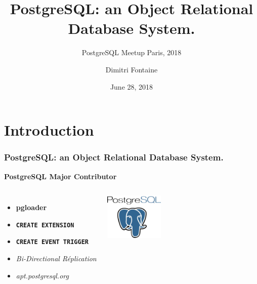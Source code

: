 \documentclass[xcolor=dvipsnames]{beamer}
\title{PostgreSQL: an Object Relational Database System.}
\subtitle{PostgreSQL Meetup Paris, 2018}
\author{Dimitri Fontaine}
\institute{CitusData}
\date{June 28, 2018}
\begin{document}
\section{Introduction}

\frame{\titlepage}

\begin{frame}[fragile]
  \frametitle{PostgreSQL: an Object Relational Database System.}

  \begin{center}
    {}
    \vfill
    {\Large \textbf{PostgreSQL Major Contributor}}
  \end{center}

\begin{columns}[c]

  \begin{itemize}
   \item \textbf{pgloader}
   \item \texttt{\textbf{CREATE EXTENSION}}
   \item \texttt{\textbf{CREATE EVENT TRIGGER}}
   \item \textit{Bi-Directional Réplication}
   \item \textit{apt.postgresql.org}
  \end{itemize}  

\begin{center}
  \includegraphics[height=6em]{postgres-logo.png}
\end{center}
\end{columns}
\end{frame}
\end{document}
